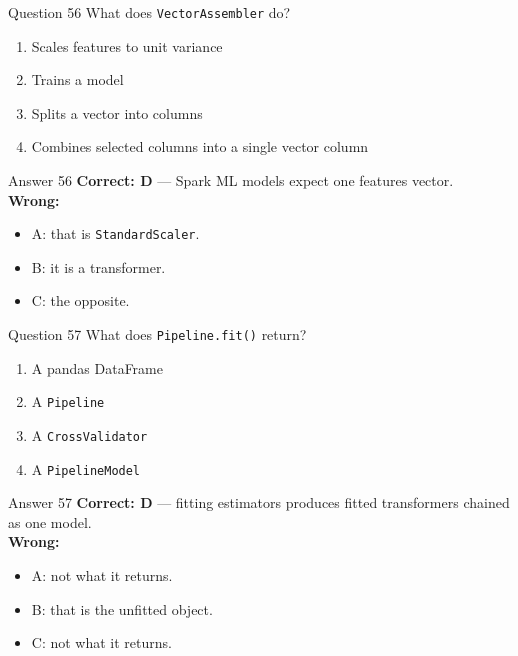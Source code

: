 \documentclass[aspectratio=169,11pt]{beamer}
\begin{document}
	\begin{frame}{Question 56}
		What does \texttt{VectorAssembler} do?
		\begin{enumerate}[label=\Alph*.]
			\item Scales features to unit variance
			\item Trains a model
			\item Splits a vector into columns
			\item Combines selected columns into a single vector column
		\end{enumerate}
	\end{frame}
	\begin{frame}{Answer 56}
		\textbf{Correct: D} --- Spark ML models expect one features vector.\\
		\vspace{0.5em}
		\textbf{Wrong:}
		\begin{itemize}
			\item A: that is \texttt{StandardScaler}.
			\item B: it is a transformer.
			\item C: the opposite.
		\end{itemize}
	\end{frame}
	
	\begin{frame}{Question 57}
		What does \texttt{Pipeline.fit()} return?
		\begin{enumerate}[label=\Alph*.]
			\item A pandas DataFrame
			\item A \texttt{Pipeline}
			\item A \texttt{CrossValidator}
			\item A \texttt{PipelineModel}
		\end{enumerate}
	\end{frame}
	\begin{frame}{Answer 57}
		\textbf{Correct: D} --- fitting estimators produces fitted transformers chained as one model.\\
		\vspace{0.5em}
		\textbf{Wrong:}
		\begin{itemize}
			\item A: not what it returns.
			\item B: that is the unfitted object.
			\item C: not what it returns.
		\end{itemize}
	\end{frame}
	
\end{document}
